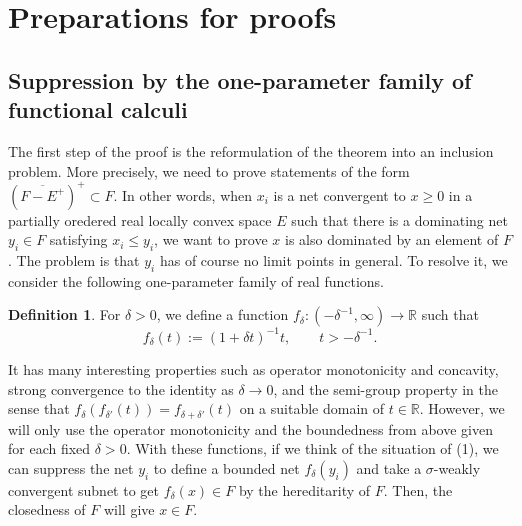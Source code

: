 \documentclass[noamsfonts,a4paper,10pt]{amsart}
\theoremstyle{plain}
\theoremstyle{definition}
\newtheorem{defn}[thm]{Definition}
\theoremstyle{remark}
\begin{document}
\section{Preparations for proofs}


\subsection{Suppression by the one-parameter family of functional calculi}

The first step of the proof is the reformulation of the theorem into an inclusion problem.
More precisely, we need to prove statements of the form $(\overline{F-E^+})^+\subset F$.
In other words, when $x_i$ is a net convergent to $x\ge0$ in a partially oredered real locally convex space $E$ such that there is a dominating net $y_i\in F$ satisfying $x_i\le y_i$, we want to prove $x$ is also dominated by an element of $F$.
The problem is that $y_i$ has of course no limit points in general.
To resolve it, we consider the following one-parameter family of real functions.
\begin{defn}
For $\delta>0$, we define a function $f_\delta:(-\delta^{-1},\infty)\to\mathbb{R}$ such that
\[f_\delta(t):=(1+\delta t)^{-1}t,\qquad t>-\delta^{-1}.\]
\end{defn}
It has many interesting properties such as operator monotonicity and concavity, strong convergence to the identity as $\delta\to0$, and the semi-group property in the sense that $f_\delta(f_{\delta'}(t))=f_{\delta+\delta'}(t)$ on a suitable domain of $t\in\mathbb{R}$.
However, we will only use the operator monotonicity and the boundedness from above given for each fixed $\delta>0$.
With these functions, if we think of the situation of (1), we can suppress the net $y_i$ to define a bounded net $f_\delta(y_i)$ and take a $\sigma$-weakly convergent subnet to get $f_\delta(x)\in F$ by the hereditarity of $F$.
Then, the closedness of $F$ will give $x\in F$.
\end{document}
